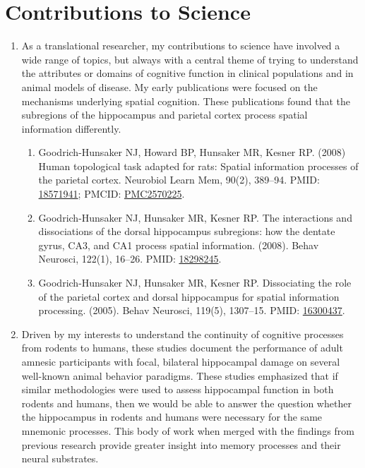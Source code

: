 \documentclass{nihbiosketch}
\begin{document}

\section{Contributions to Science}

\begin{enumerate}
	
	\item As a translational researcher, my contributions to science have involved a wide range of topics, but always with a central theme of trying to understand the attributes or domains of cognitive function in clinical populations and in animal models of disease. My early publications were focused on the mechanisms underlying spatial cognition. These publications found that the subregions of the hippocampus and parietal cortex process spatial information differently. 
	      
	      \begin{enumerate}
	      	
	      	\item Goodrich-Hunsaker NJ, Howard BP, Hunsaker MR, Kesner RP. (2008) Human topological task adapted for rats: Spatial information processes of the parietal cortex. Neurobiol Learn Mem, 90(2), 389--94. PMID: \href{https:/pubmed.gov/18571941}{18571941}; PMCID: \href{https://www.ncbi.nlm.nih.gov/pmc/articles/PMC2570225}{PMC2570225}.
	      	      
	      	\item Goodrich-Hunsaker NJ, Hunsaker MR, Kesner RP. The interactions and dissociations of the dorsal hippocampus subregions: how the dentate gyrus, CA3, and CA1 process spatial information. (2008). Behav Neurosci, 122(1), 16--26. PMID: \href{https:/pubmed.gov/18298245}{18298245}.
	      	      
	      	\item Goodrich-Hunsaker NJ, Hunsaker MR, Kesner RP. Dissociating the role of the parietal cortex and dorsal hippocampus for spatial information processing. (2005). Behav Neurosci, 119(5), 1307--15. PMID: \href{https:/pubmed.gov/16300437}{16300437}.
	      	      
	      \end{enumerate}
	      
	      
	\item Driven by my interests to understand the continuity of cognitive processes from rodents to humans, these studies document the performance of adult amnesic participants with focal, bilateral hippocampal damage on several well-known animal behavior paradigms. These studies emphasized that if similar methodologies were used to assess hippocampal function in both rodents and humans, then we would be able to answer the question whether the hippocampus in rodents and humans were necessary for the same mnemonic processes. This body of work when merged with the findings from previous research provide greater insight into memory processes and their neural substrates.    
	      

\end{enumerate}
\end{document}
